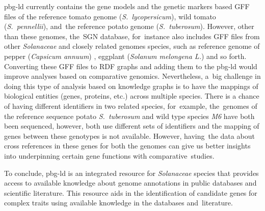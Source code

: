\documentclass[applsci,article,accept,moreauthors,pdftex]{Definitions/mdpi}
\begin{document}
{pbg-ld %
currently contains the gene models and the genetic markers based GFF files of the reference tomato genome (\textit{S.~lycopersicum}), wild tomato  (\textit{S.~pennellii}), and~the reference potato genome (\textit{S.~tuberosum}). However, other than these genomes, the~SGN database, for~instance also includes GFF files from other \textit{Solanaceae} %
and closely related genomes species, such as reference genome of pepper (\textit{Capsicum annuum}) \cite{hulse2018reference}, eggplant (\textit{Solanum melongena L.}) \cite{hirakawa2014draft} and so forth.
Converting these GFF files to RDF graphs and adding them %
to the pbg-ld would improve analyses based on comparative genomics. Nevertheless, a~big challenge in doing this type of analysis based on knowledge graphs is to have the mappings of biological entities (genes, proteins, etc.) across multiple species.
There is a chance of having different identifiers in two related species, for~example, the~genomes of the reference sequence potato \textit{S.~tuberosum} and wild type species \textit{M6} have both been sequenced, however, both use different sets of identifiers and the mapping of genes between these genotypes is not available. However, having~the data about cross references in these genes for both the genomes can give us better insights into underpinning certain gene functions with comparative~studies.

To conclude, pbg-ld is an integrated resource for \textit{Solanaceae} species that provides access to available knowledge about genome annotations in public databases and scientific literature. This resource aids in the identification of candidate genes for complex traits using available knowledge in the databases and~literature.







}
\end{document}

